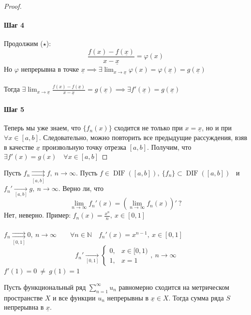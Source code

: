 \documentclass[11pt]{article}
\DeclareMathOperator{\DIF}{DIF}
\begin{document}
\begin{proof}
    \paragraph{Шаг 4}

    Продолжим ($\star$):
    \[\frac{f(x) - f(\underline{x})}{x - \underline{x}} = \varphi(x)\]
    Но $\varphi$ непрерывна в точке $\underline{x} \implies \exists 
    \displaystyle \lim_{x \to \underline{x}} \varphi(x) = \varphi
    (\underline{x}) = g(\underline{x})$ \\ \\
    Тогда $\exists \displaystyle \lim_{x \to \underline{x}} \frac{f(x) - 
    f(\underline{x})}{x - \underline{x}} = g(\underline{x}) \implies 
    \exists f'(\underline{x}) = g(\underline{x})$

    \paragraph{Шаг 5}

    Теперь мы уже знаем, что $\{f_n(x)\}$ сходится не только при $x = 
    \underline{x}$, но и при $\forall x \in [a, b]$. Следовательно, можно 
    повторить все предыдущие рассуждения, взяв в качестве $\underline{x}$ 
    произвольную точку отрезка $[a, b]$. Получим, что \ $\exists f'(x) = 
    g(x) \quad \forall x \in [a, b]$
\end{proof}

\begin{remark}
    Пусть $f_n \underset{[a, b]}{\rightrightarrows} f, \ n \to \infty$. 
    Пусть $f \in \DIF([a, b]), \ \{f_n\} \subset \DIF([a, b])$ \ и \
    $f_n' \xrightarrow[{[a, b]}]{} g, \ n \to \infty$. Верно ли, что 
    \[\lim_{n \to \infty}f_n'(x) = \left(\lim_{n \to \infty}f_n(x)\right)' 
    \ ?\]
    Нет, неверно. Пример: $f_n(x) = \displaystyle \frac{x^n}{n}, \ x \in 
    [0, 1]$ \\ \\
    $f_n \underset{[0, 1]}{\rightrightarrows} 0, \ n \to \infty \quad 
    \quad \forall n \in \mathbb{N} \quad f_n'(x) = x^{n - 1}, \ x \in 
    [0, 1]$
    \[f_n' \xrightarrow[{[0, 1]}]{} 
    \begin{cases}
        0, & x \in [0, 1) \\
        1, & x = 1
    \end{cases}, \ n \to \infty\]
    $f'(1) = 0 \ \neq \ g(1) = 1$
\end{remark}

\begin{lemma}
    Пусть функциональный ряд $\displaystyle \sum_{n = 1}^{\infty} u_n$ 
    равномерно сходится на метрическом пространстве $X$ и все функции 
    $u_n$ непрерывны в $\underline{x} \in X$. Тогда сумма ряда $S$ 
    непрерывна в $\underline{x}$.
\end{lemma}
\end{document}
